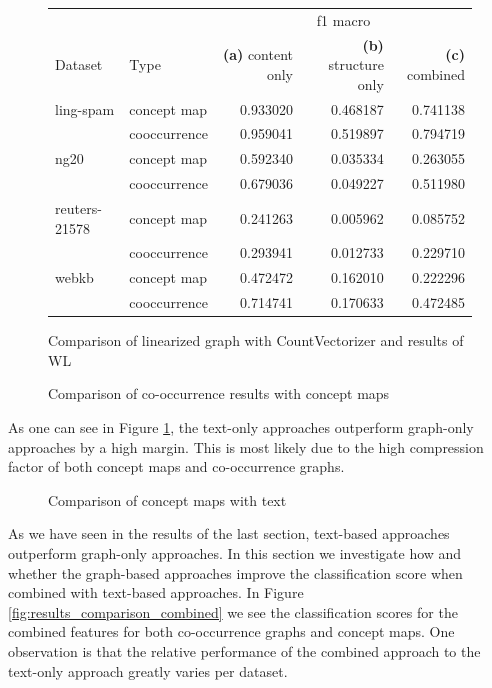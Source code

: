 \begin{figure}[ht]
\centering
\begin{tabular}{llrrr}
          & & \multicolumn{3}{c}{f1 macro} \\
Dataset & Type & \textbf{(a)} content only & \textbf{(b)} structure only & \textbf{(c)} combined\\
\midrule
ling-spam & concept map &  0.933020 &  0.468187 &  0.741138 \\
          & cooccurrence &  0.959041 &  0.519897 &  0.794719 \\
\midrule
ng20 & concept map &  0.592340 &  0.035334 &  0.263055 \\
          & cooccurrence &  0.679036 &  0.049227 &  0.511980 \\
\midrule
reuters-21578 & concept map &  0.241263 &  0.005962 &  0.085752 \\
          & cooccurrence &  0.293941 &  0.012733 &  0.229710 \\
\midrule
webkb & concept map &  0.472472 &  0.162010 &  0.222296 \\
          & cooccurrence &  0.714741 &  0.170633 &  0.472485 \\
\bottomrule
\end{tabular}
\caption{Comparison of linearized graph with CountVectorizer and results of WL}
\end{figure}


\begin{figure}[ht]
\centering
\missingfigure[figcolor=white]{}
\caption{Comparison of co-occurrence results with concept maps}
\end{figure}

As one can see in Figure \ref{fig:results_cmap_vs_text}, the text-only approaches outperform graph-only approaches by a high margin.
This is most likely due to the high compression factor of both concept maps and co-occurrence graphs.

\begin{figure}[ht]
\centering
\missingfigure[figcolor=white]{}
\caption{Comparison of concept maps with text}
\label{fig:results_cmap_vs_text}
\end{figure}

As we have seen in the results of the last section, text-based approaches outperform graph-only approaches.
In this section we investigate how and whether the graph-based approaches improve the classification score when combined with text-based approaches.
In Figure \ref{fig:results_comparison_combined} we see the classification scores for the combined features for both co-occurrence graphs and concept maps.
One observation is that the relative performance of the combined approach to the text-only approach greatly varies per dataset.

